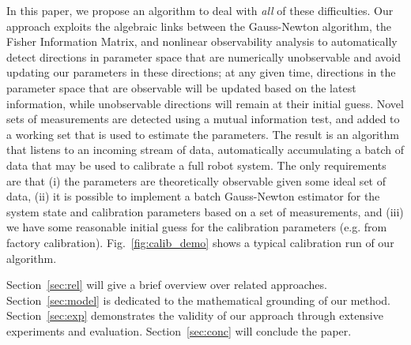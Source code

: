 In this paper, we propose an algorithm to deal with {\em all} of these
difficulties. Our approach exploits the algebraic links between the Gauss-Newton
algorithm, the Fisher Information Matrix, and nonlinear observability analysis
to automatically detect directions in parameter space that are numerically
unobservable and avoid updating our parameters in these directions; at any given
time, directions in the parameter space that are observable will be updated
based on the latest information, while unobservable directions will remain at
their initial guess. Novel sets of measurements are detected using a mutual
information test, and added to a working set that is used to estimate the
parameters. The result is an algorithm that listens to an incoming stream of
data, automatically accumulating a batch of data that may be used to calibrate a
full robot system. The only requirements are that (i) the parameters are
theoretically observable given some ideal set of data, (ii) it is possible to
implement a batch Gauss-Newton estimator for the system state and calibration
parameters based on a set of measurements, and (iii) we have some reasonable
initial guess for the calibration parameters (e.g. from factory calibration).
Fig.~\ref{fig:calib_demo} shows a typical calibration run of our algorithm.

Section~\ref{sec:rel}
will give a brief overview over related approaches. Section~\ref{sec:model} is
dedicated to the mathematical grounding of our method.
Section~\ref{sec:exp} demonstrates the validity of our approach through
extensive experiments and evaluation. Section~\ref{sec:conc} will conclude the
paper.
